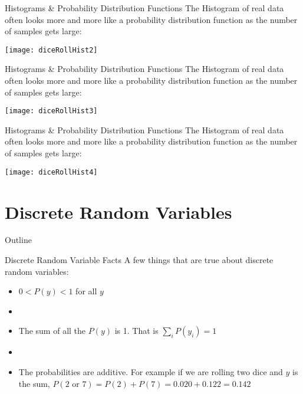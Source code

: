 \documentclass[xcolor=dvipsnames]{beamer}
\begin{document}
\begin{frame}{Histograms \& Probability Distribution Functions}
	The Histogram of real data often looks more and more like a probability distribution function as the number of samples gets large:
	\begin{center}
		\texttt{[image: diceRollHist2]}
	\end{center}
\end{frame}

\begin{frame}{Histograms \& Probability Distribution Functions}
	The Histogram of real data often looks more and more like a probability distribution function as the number of samples gets large:
	\begin{center}
		\texttt{[image: diceRollHist3]}
	\end{center}
\end{frame}

\begin{frame}{Histograms \& Probability Distribution Functions}
	The Histogram of real data often looks more and more like a probability distribution function as the number of samples gets large:
	\begin{center}
		\texttt{[image: diceRollHist4]}
	\end{center}
\end{frame}

\section{Discrete Random Variables}
\begin{frame}{Outline}
	\tableofcontents[currentsection,subsectionstyle=show/shaded/hide]
\end{frame}

\begin{frame}{Discrete Random Variable Facts}
	A few things that are true about discrete random variables:
	\begin{itemize}
		\item $0 < P(y) < 1$ for all $y$
		\item[]
		\item The sum of all the $P(y)$ is 1. That is $\sum_{i} P(y_i) = 1$
		\item[]
		\item The probabilities are additive. For example if we are rolling two dice and $y$ is the sum, $P(2 \text{ or } 7) = P(2) + P(7) = 0.020 + 0.122 = 0.142$
	\end{itemize}
\end{frame}
\end{document}

